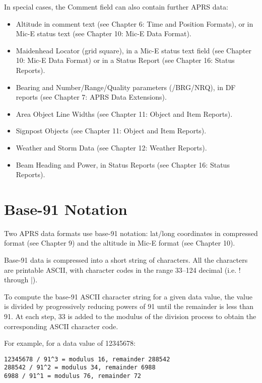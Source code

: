 In special cases, the Comment field can also contain further APRS data:

\begin{itemize}


\item Altitude in comment text (see Chapter 6: Time and Position Formats), or
in Mic-E status text (see Chapter 10: Mic-E Data Format).

\item Maidenhead Locator (grid square), in a Mic-E status text field (see
Chapter 10: Mic-E Data Format) or in a Status Report (see Chapter 16:
Status Reports).

\item Bearing and Number/Range/Quality parameters (/BRG/NRQ), in DF
reports (see Chapter 7: APRS Data Extensions).

\item Area Object Line Widths (see Chapter 11: Object and Item Reports).

\item Signpost Objects (see Chapter 11: Object and Item Reports).

\item Weather and Storm Data (see Chapter 12: Weather Reports).

\item Beam Heading and Power, in Status Reports (see Chapter 16: Status
Reports).

\end{itemize}

\section{Base-91 Notation}

Two APRS data formats use base-91 notation: lat/long coordinates in
compressed format (see Chapter 9) and the altitude in Mic-E format (see
Chapter 10).

Base-91 data is compressed into a short string of characters. All the
characters are printable ASCII, with character codes in the range 33–124
decimal (i.e. ! through |).

To compute the base-91 ASCII character string for a given data value, the
value is divided by progressively reducing powers of 91 until the remainder
is less than 91. At each step, 33 is added to the modulus of the division
process to obtain the corresponding ASCII character code.

For example, for a data value of 12345678:
\begin{verbatim}
12345678 / 91^3 = modulus 16, remainder 288542
288542 / 91^2 = modulus 34, remainder 6988
6988 / 91^1 = modulus 76, remainder 72
\end{verbatim}

